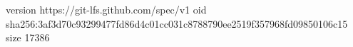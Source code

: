 version https://git-lfs.github.com/spec/v1
oid sha256:3af3d70c93299477fd86d4c01cc031c8788790ee2519f357968fd09850106c15
size 17386
